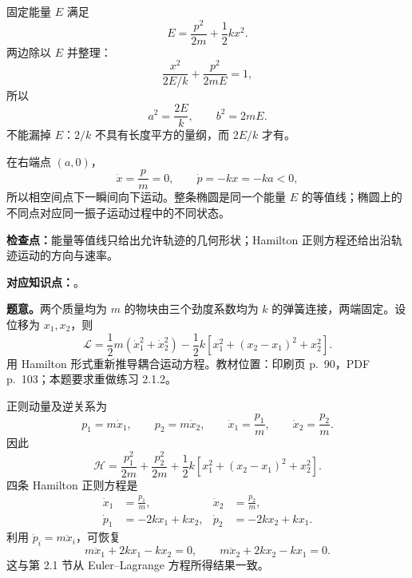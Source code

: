\begin{checkedsolution}
固定能量 $E$ 满足
\begin{equation}
  E=\frac{p^2}{2m}+\frac12kx^2.
  \label{eq:QM-C02-S05-E02-energy}
\end{equation}
两边除以 $E$ 并整理：
\begin{equation}
  \boxed{
  \frac{x^2}{2E/k}+\frac{p^2}{2mE}=1,}
  \label{eq:QM-C02-S05-E02-ellipse}
\end{equation}
所以
\begin{equation}
  \boxed{
  a^2=\frac{2E}{k},
  \qquad
  b^2=2mE.}
  \label{eq:QM-C02-S05-E02-semiaxes}
\end{equation}
不能漏掉 $E$：$2/k$ 不具有长度平方的量纲，而 $2E/k$ 才有。

在右端点 $(a,0)$，
\[
  \dot x=\frac pm=0,
  \qquad
  \dot p=-kx=-ka<0,
\]
所以相空间点下一瞬间向下运动。整条椭圆是同一个能量 $E$ 的等值线；椭圆上的不同点对应同一振子运动过程中的不同状态。
\end{checkedsolution}

\textbf{检查点：}能量等值线只给出允许轨迹的几何形状；Hamilton 正则方程还给出沿轨迹运动的方向与速率。


\textbf{对应知识点：}。

\textbf{题意。}两个质量均为 $m$ 的物块由三个劲度系数均为 $k$ 的弹簧连接，两端固定。设位移为 $x_1,x_2$，则
\begin{equation}
  \mathcal L
  =\frac12m(\dot x_1^2+\dot x_2^2)
  -\frac12k\left[x_1^2+(x_2-x_1)^2+x_2^2\right].
  \label{eq:QM-C02-S05-E03-lagrangian}
\end{equation}
用 Hamilton 形式重新推导耦合运动方程。教材位置：印刷页 p.~90，PDF p.~103；本题要求重做练习 2.1.2。

\begin{checkedsolution}
正则动量及逆关系为
\begin{equation}
  p_1=m\dot x_1,
  \qquad
  p_2=m\dot x_2,
  \qquad
  \dot x_1=\frac{p_1}{m},
  \qquad
  \dot x_2=\frac{p_2}{m}.
  \label{eq:QM-C02-S05-E03-momenta}
\end{equation}
因此
\begin{equation}
  \boxed{
  \mathcal H
  =\frac{p_1^2}{2m}+\frac{p_2^2}{2m}
  +\frac12k\left[x_1^2+(x_2-x_1)^2+x_2^2\right].}
  \label{eq:QM-C02-S05-E03-hamiltonian}
\end{equation}
四条 Hamilton 正则方程是
\begin{align}
  \dot x_1&=\frac{p_1}{m},
  &\dot x_2&=\frac{p_2}{m},
  \label{eq:QM-C02-S05-E03-coordinate-equations}\\
  \dot p_1&=-2kx_1+kx_2,
  &\dot p_2&=-2kx_2+kx_1.
  \label{eq:QM-C02-S05-E03-momentum-equations}
\end{align}
利用 $\dot p_i=m\ddot x_i$，可恢复
\begin{equation}
  \boxed{
  m\ddot x_1+2kx_1-kx_2=0,
  \qquad
  m\ddot x_2+2kx_2-kx_1=0.}
  \label{eq:QM-C02-S05-E03-coupled-equations}
\end{equation}
这与第 2.1 节从 Euler--Lagrange 方程所得结果一致。
\end{checkedsolution}

